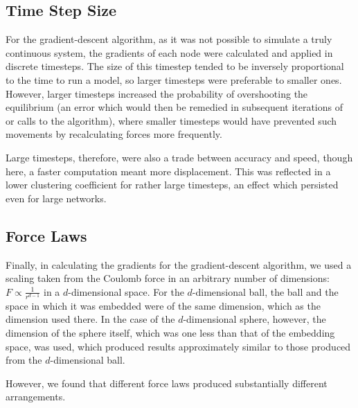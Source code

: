 \documentclass[aps,pre,reprint,superscriptaddress,amsmath,amssymb,nofootinbib]{revtex4-1}
\begin{document}
\subsection{Time Step Size}
For the gradient-descent algorithm, as it was not possible to simulate a truly continuous system, the gradients of each node were calculated and applied in discrete timesteps.  
The size of this timestep tended to be inversely proportional to the time to run a model, so larger timesteps were preferable to smaller ones.  
However, larger timesteps increased the probability of overshooting the equilibrium (an error which would then be remedied in subsequent iterations of or calls to the algorithm), where smaller timesteps would have prevented such movements by recalculating forces more frequently.

Large timesteps, therefore, were also a trade between accuracy and speed, though here, a faster computation meant more displacement.  
This was reflected in a lower clustering coefficient for rather large timesteps, an effect which persisted even for large networks.

\subsection{Force Laws} %
Finally, in calculating the gradients for the gradient-descent algorithm, we used a scaling taken from the Coulomb force in an arbitrary number of dimensions: $F \propto \frac{1}{r^{d-1}}$ in a $d$-dimensional space.  
For the $d$-dimensional ball, the ball and the space in which it was embedded were of the same dimension, which as the dimension used there.  
In the case of the $d$-dimensional sphere, however, the dimension of the sphere itself, which was one less than that of the embedding space, was used, which produced results approximately similar to those produced from the $d$-dimensional ball.

However, we found that different force laws produced substantially different arrangements.  %
\end{document}
